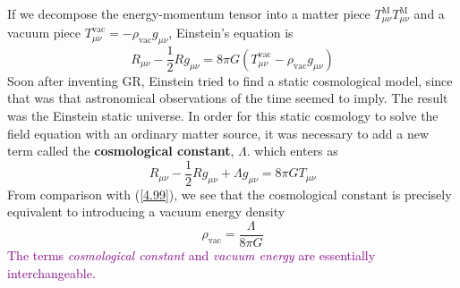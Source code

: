 If we decompose the energy-momentum tensor into a matter piece $T_{\mu\nu}^{\text{M}}T_{\mu\nu}^{\text{M}}$ and a vacuum piece $T_{\mu\nu}^{\text{vac}}=-\rho_{\text{vac}}g_{\mu\nu}$, Einstein's equation is
\begin{equation}\label{4.99}
    R_{\mu\nu}-\frac{1}{2}Rg_{\mu\nu}=8\pi G\left(T_{\mu\nu}^{\text{vac}}-\rho_{\text{vac}}g_{\mu\nu}\right)
\end{equation}
Soon after inventing GR, Einstein tried to find a static cosmological model, since that was that astronomical observations of the time seemed to imply. The result was the Einstein static universe. In order for this static cosmology to solve the field equation with an ordinary matter source, it was necessary to add a new term called the \textbf{cosmological constant}, $\Lambda$. which enters as
\begin{equation*}
      R_{\mu\nu}-\frac{1}{2}Rg_{\mu\nu}+\Lambda g_{\mu\nu}=8\pi GT_{\mu\nu}
\end{equation*}
From comparison with (\ref{4.99}), we see that the cosmological constant is precisely equivalent to introducing a vacuum energy density
\begin{equation*}
    \rho_{\text{vac}}=\frac{\Lambda}{8\pi G}
\end{equation*}
\textcolor{purple}{The terms \textit{cosmological constant} and \textit{vacuum energy} are essentially interchangeable.}
